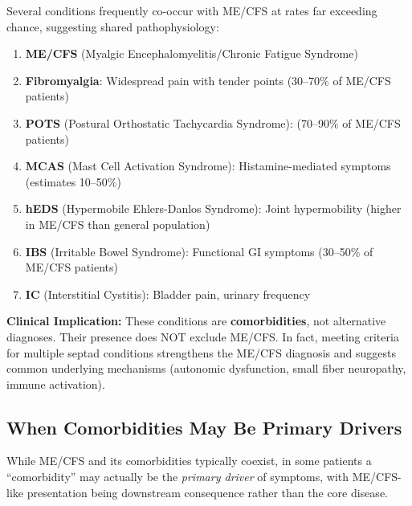 \begin{observation}
\label{obs:mecfs-septad}
Several conditions frequently co-occur with ME/CFS at rates far exceeding chance, suggesting shared pathophysiology:

\begin{enumerate}
    \item \textbf{ME/CFS} (Myalgic Encephalomyelitis/Chronic Fatigue Syndrome)
    \item \textbf{Fibromyalgia}: Widespread pain with tender points (30--70\% of ME/CFS patients)
    \item \textbf{POTS} (Postural Orthostatic Tachycardia Syndrome): (70--90\% of ME/CFS patients)
    \item \textbf{MCAS} (Mast Cell Activation Syndrome): Histamine-mediated symptoms (estimates 10--50\%)
    \item \textbf{hEDS} (Hypermobile Ehlers-Danlos Syndrome): Joint hypermobility (higher in ME/CFS than general population)
    \item \textbf{IBS} (Irritable Bowel Syndrome): Functional GI symptoms (30--50\% of ME/CFS patients)
    \item \textbf{IC} (Interstitial Cystitis): Bladder pain, urinary frequency
\end{enumerate}

\textbf{Clinical Implication:}
These conditions are \textbf{comorbidities}, not alternative diagnoses. Their presence does NOT exclude ME/CFS. In fact, meeting criteria for multiple septad conditions strengthens the ME/CFS diagnosis and suggests common underlying mechanisms (autonomic dysfunction, small fiber neuropathy, immune activation).
\end{observation}

\subsection{When Comorbidities May Be Primary Drivers}
\label{sec:comorbidity-primary}

While ME/CFS and its comorbidities typically coexist, in some patients a ``comorbidity'' may actually be the \textit{primary driver} of symptoms, with ME/CFS-like presentation being downstream consequence rather than the core disease.

